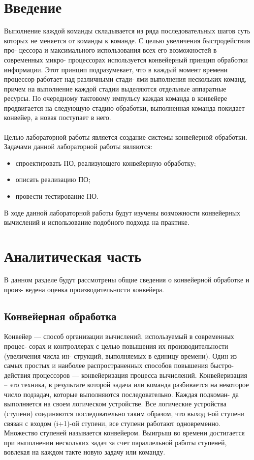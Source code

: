 \documentclass[12pt,a4paper]{article}
\numberwithin{equation}{section}
\begin{document}
\section*{\Huge Введение}
Выполнение каждой команды складывается из ряда последовательных шагов суть
которых не меняется от команды к команде. С целью увеличения быстродействия про-
цессора и максимального использования всех его возможностей в современных микро-
процессорах используется конвейерный принцип обработки информации. Этот принцип
подразумевает, что в каждый момент времени процессор работает над различными стади-
ями выполнения нескольких команд, причем на выполнение каждой стадии выделяются
отдельные аппаратные ресурсы. По очередному тактовому импульсу каждая команда в
конвейере продвигается на следующую стадию обработки, выполненная команда покидает
конвейер, а новая поступает в него.\\\\
Целью лабораторной работы является создание системы конвейерной обработки.\\
Задачами данной лабораторной работы являются:\\
\begin{itemize}
	\item спроектировать ПО, реализующего конвейерную обработку;
	\item описать реализацию ПО;
	\item провести тестирование ПО.
\end{itemize}

В ходе данной лабораторной работы будут изучены возможности конвейерных вычислений и использование подобного подхода на практике.
\clearpage

\section{Аналитическая часть}
В данном разделе будут рассмотрены общие сведения о конвейерной обработке и произ-
ведена оценка производительности конвейера.

\subsection{Конвейерная обработка}
\qquad Конвейер — способ организации вычислений, используемый в современных процес-
сорах и контроллерах с целью повышения их производительности (увеличения числа ин-
струкций, выполняемых в единицу времени).
Один из самых простых и наиболее распространенных способов повышения быстро-
действия процессоров — конвейеризация процесса вычислений.
Конвейеризация – это техника, в результате которой задача или команда разбивается
на некоторое число подзадач, которые выполняются последовательно. Каждая подкоман-
да выполняется на своем логическом устройстве. Все логические устройства (ступени)
соединяются последовательно таким образом, что выход i-ой ступени связан с входом
(i+1)-ой ступени, все ступени работают одновременно. Множество ступеней называется
конвейером. Выигрыш во времени достигается при выполнении нескольких задач за счет
параллельной работы ступеней, вовлекая на каждом такте новую задачу или команду.
\end{document}
